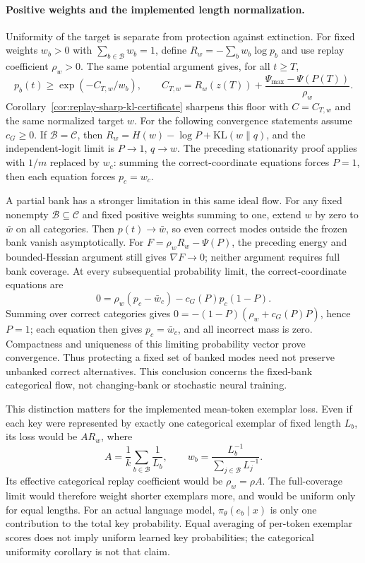 \documentclass{article}
\newcommand{\1}{\mathbf 1}
\theoremstyle{remark}
\theoremstyle{definition}
\theoremstyle{plain}
\begin{document}
\paragraph{Positive weights and the implemented length normalization.}
Uniformity of the target is separate from protection against extinction.
For fixed weights $w_b>0$ with $\sum_{b\in\mathcal B}w_b=1$, define
$R_w=-\sum_b w_b\log p_b$ and use replay coefficient $\rho_w>0$.
The same potential argument gives, for all $t\ge T$,
\[
 p_b(t)\ge\exp(-C_{T,w}/w_b),\qquad
 C_{T,w}=R_w(z(T))+\frac{\Psi_{\max}-\Psi(P(T))}{\rho_w}.
\]
Corollary~\ref{cor:replay-sharp-kl-certificate} sharpens this floor with
$C=C_{T,w}$ and the same normalized target $w$.
For the following convergence statements assume $c_G\ge0$.
If $\mathcal B=\mathcal C$, then
$R_w=H(w)-\log P+\mathrm{KL}(w\|q)$, and the independent-logit limit is
$P\to1$, $q\to w$. The preceding stationarity proof applies with $1/m$
replaced by $w_c$: summing the correct-coordinate equations forces $P=1$,
then each equation forces $p_c=w_c$.

A partial bank has a stronger limitation in this same ideal flow. For any
fixed nonempty $\mathcal B\subseteq\mathcal C$ and fixed positive weights
summing to one, extend $w$ by zero to $\bar w$ on all categories. Then
$p(t)\to\bar w$, so even correct modes outside the frozen bank vanish
asymptotically. For $F=\rho_wR_w-\Psi(P)$, the preceding energy and
bounded-Hessian argument still gives $\nabla F\to0$; neither argument
requires full bank coverage.
At every subsequential probability limit, the correct-coordinate equations are
\[
 0=\rho_w(p_c-\bar w_c)-c_G(P)p_c(1-P).
\]
Summing over correct categories gives
$0=-(1-P)(\rho_w+c_G(P)P)$, hence $P=1$; each equation then gives
$p_c=\bar w_c$, and all incorrect mass is zero. Compactness and uniqueness
of this limiting probability vector prove convergence. Thus protecting a
fixed set of banked modes need not preserve unbanked correct alternatives.
This conclusion concerns the fixed-bank categorical flow, not changing-bank
or stochastic neural training.

This distinction matters for the implemented mean-token exemplar loss.
Even if each key were represented by exactly one categorical exemplar of
fixed length $L_b$, its loss would be $A R_w$, where
\[
 A=\frac1k\sum_{b\in\mathcal B}\frac1{L_b},\qquad
 w_b=\frac{L_b^{-1}}{\sum_{j\in\mathcal B}L_j^{-1}}.
\]
Its effective categorical replay coefficient would be $\rho_w=\rho A$.
The full-coverage limit would therefore weight shorter exemplars more, and
would be uniform only for equal lengths. For an actual language model,
$\pi_\theta(e_b\mid x)$ is only one contribution to the total key probability.
Equal averaging of per-token exemplar scores does not imply uniform learned
key probabilities; the categorical uniformity corollary is not that claim.
\end{document}

